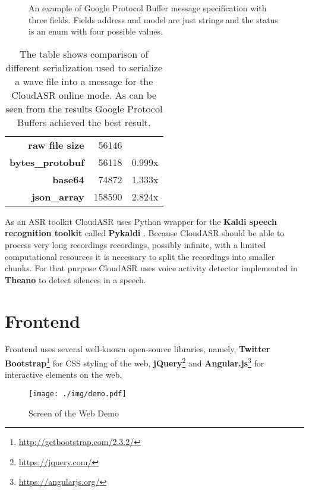 \begin{figure}[h]
  

  \caption{
    An example of Google Protocol Buffer message specification with three fields.
    Fields address and model are just strings and the status is an enum with four possible values.
  }
  \label{fig:protobuf}
\end{figure}

\begin{table}
  \begin{tabular}{rrl}
  \textbf{raw file size} & 56146 & \\
  \cline{1-3}
  \textbf{bytes\_protobuf} & 56118 & 0.999x \\
  \textbf{base64} & 74872 & 1.333x \\
  \textbf{json\_array} & 158590 & 2.824x \\
  \end{tabular}

  \caption{
    The table shows comparison of different serialization used to serialize a wave file into a message for the CloudASR online mode.
    As can be seen from the results Google Protocol Buffers achieved the best result.
  }
  \label{fig:protobuf-benchmark}
\end{table}

As an ASR toolkit CloudASR uses Python wrapper for the \textbf{Kaldi speech recognition toolkit} \cite{povey2011kaldi} called \textbf{Pykaldi} \cite{platek2014free}.
Because CloudASR should be able to process very long recordings recordings, possibly infinite,
  with a limited computational resources
  it is necessary to split the recordings into smaller chunks.
For that purpose CloudASR uses voice activity detector implemented in \textbf{Theano} \cite{bergstra2010theano} to detect silences in a speech.


\section{Frontend}
Frontend uses several well-known open-source libraries, namely,
  \textbf{Twitter Bootstrap}\footnote{\url{http://getbootstrap.com/2.3.2/}} for CSS styling of the web,
  \textbf{jQuery}\footnote{\url{https://jquery.com/}}
  and \textbf{Angular.js}\footnote{\url{https://angularjs.org/}} for interactive elements on the web.

\begin{figure}[h]
  \centering
  \texttt{[image: ./img/demo.pdf]}

  \caption{Screen of the Web Demo}
  \label{fig:demo}
\end{figure}

